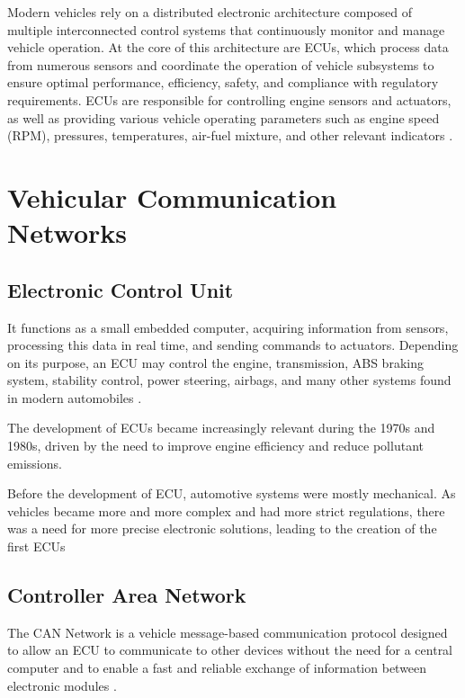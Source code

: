 

\hspace{5mm} Modern vehicles rely on a distributed electronic architecture composed of multiple interconnected control systems that continuously monitor and manage vehicle operation. At the core of this architecture are ECUs, which process data from numerous sensors and coordinate the operation of vehicle subsystems to ensure optimal performance, efficiency, safety, and compliance with regulatory requirements. ECUs are responsible for controlling engine sensors and actuators, as well as providing various vehicle operating parameters such as engine speed (RPM), pressures, temperatures, air-fuel mixture, and other relevant indicators \cite{jg}.



\section{Vehicular Communication Networks}

\subsection{Electronic Control Unit}

It functions as a small embedded computer, acquiring information from sensors, processing this data in real time, and sending commands to actuators. Depending on its purpose, an ECU may control the engine, transmission, ABS braking system, stability control, power steering, airbags, and many other systems found in modern automobiles \cite{jg}.

The development of ECUs became increasingly relevant during the 1970s and 1980s, driven by the need to improve engine efficiency and reduce pollutant emissions. 

Before the development of ECU, automotive systems were mostly mechanical. As vehicles became more and more complex and had more strict regulations, there was a need for more precise electronic solutions, leading to the creation of the first ECUs


\subsection{Controller Area Network}


The \ac{CAN} Network is a vehicle message-based communication protocol designed to allow an ECU to communicate to other devices without the need for a central computer and to enable a fast and reliable exchange of information between electronic modules \cite{iso11898}. 

